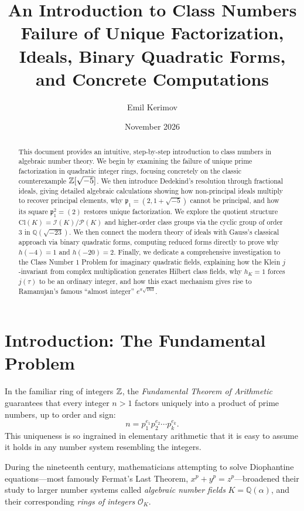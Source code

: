 \documentclass[a4paper]{article}
\title{\textbf{An Introduction to Class Numbers}\\[4pt]\large Failure of Unique Factorization, Ideals, Binary Quadratic Forms, and Concrete Computations}
\author{Emil Kerimov}
\date{November 2026}
\begin{document}
\maketitle

\begin{abstract}
This document provides an intuitive, step-by-step introduction to class numbers in algebraic number theory. We begin by examining the failure of unique prime factorization in quadratic integer rings, focusing concretely on the classic counterexample $\mathbb{Z}[\sqrt{-5}]$. We then introduce Dedekind's resolution through fractional ideals, giving detailed algebraic calculations showing how non-principal ideals multiply to recover principal elements, why $\mathfrak{p}_1 = (2, 1+\sqrt{-5})$ cannot be principal, and how its square $\mathfrak{p}_1^2 = (2)$ restores unique factorization. We explore the quotient structure $\mathrm{Cl}(K) = \mathcal{I}(K)/\mathcal{P}(K)$ and higher-order class groups via the cyclic group of order $3$ in $\mathbb{Q}(\sqrt{-23})$. We then connect the modern theory of ideals with Gauss's classical approach via binary quadratic forms, computing reduced forms directly to prove why $h(-4) = 1$ and $h(-20) = 2$. Finally, we dedicate a comprehensive investigation to the Class Number $1$ Problem for imaginary quadratic fields, explaining how the Klein $j$-invariant from complex multiplication generates Hilbert class fields, why $h_K = 1$ forces $j(\tau)$ to be an ordinary integer, and how this exact mechanism gives rise to Ramanujan's famous ``almost integer'' $e^{\pi \sqrt{163}}$.
\end{abstract}

\tableofcontents
\newpage

\section{Introduction: The Fundamental Problem}
In the familiar ring of integers $\mathbb{Z}$, the \emph{Fundamental Theorem of Arithmetic} guarantees that every integer $n > 1$ factors uniquely into a product of prime numbers, up to order and sign:
\begin{equation}
 n = p_1^{e_1} p_2^{e_2} \cdots p_k^{e_k}.
\end{equation}
This uniqueness is so ingrained in elementary arithmetic that it is easy to assume it holds in any number system resembling the integers.

During the nineteenth century, mathematicians attempting to solve Diophantine equations---most famously Fermat's Last Theorem, $x^p + y^p = z^p$---broadened their study to larger number systems called \emph{algebraic number fields} $K = \mathbb{Q}(\alpha)$, and their corresponding \emph{rings of integers} $\mathcal{O}_K$. 
\end{document}

